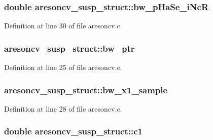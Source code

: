 \subsubsection[{\texorpdfstring{bw\+\_\+p\+Ha\+Se\+\_\+i\+NcR}{bw_pHaSe_iNcR}}]{\setlength{\rightskip}{0pt plus 5cm}double aresoncv\+\_\+susp\+\_\+struct\+::bw\+\_\+p\+Ha\+Se\+\_\+i\+NcR}\hypertarget{structaresoncv__susp__struct_a9eb6fd72fe06b456e5c86068526b54f1}{}\label{structaresoncv__susp__struct_a9eb6fd72fe06b456e5c86068526b54f1}


Definition at line 30 of file aresoncv.\+c.

\subsubsection[{\texorpdfstring{bw\+\_\+ptr}{bw_ptr}}]{ aresoncv\+\_\+susp\+\_\+struct\+::bw\+\_\+ptr}\hypertarget{structaresoncv__susp__struct_abc1af1ca41324fd75c273a67c17c9c2c}{}\label{structaresoncv__susp__struct_abc1af1ca41324fd75c273a67c17c9c2c}


Definition at line 25 of file aresoncv.\+c.

\subsubsection[{\texorpdfstring{bw\+\_\+x1\+\_\+sample}{bw_x1_sample}}]{ aresoncv\+\_\+susp\+\_\+struct\+::bw\+\_\+x1\+\_\+sample}\hypertarget{structaresoncv__susp__struct_a066a80eec2372b6025ab063f51711c73}{}\label{structaresoncv__susp__struct_a066a80eec2372b6025ab063f51711c73}


Definition at line 28 of file aresoncv.\+c.

\subsubsection[{\texorpdfstring{c1}{c1}}]{\setlength{\rightskip}{0pt plus 5cm}double aresoncv\+\_\+susp\+\_\+struct\+::c1}\hypertarget{structaresoncv__susp__struct_a4f02d6ecaef6b0c5ea0a303c1f123865}{}\label{structaresoncv__susp__struct_a4f02d6ecaef6b0c5ea0a303c1f123865}


